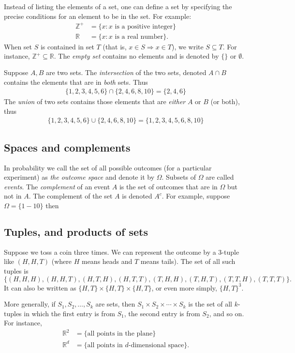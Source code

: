 Instead of listing the elements of a set, one can define a set by
specifying the precise conditions for an element to be in the set. For
example:
\begin{align*}
\mathbb{Z}^+ &= \{x: \mbox{$x$ is a positive integer}\} \\
\mathbb{R}   &= \{x: \mbox{$x$ is a real number}\} .
\end{align*}
When set $S$ is contained in set $T$ (that is, $x \in S \Rightarrow x
\in T$), we write $S \subseteq T$. For instance, $\mathbb{Z}^+
\subseteq \mathbb{R}$. The {\em empty set} contains no elements and is
denoted by $\{\}$ or $\emptyset$.

Suppose $A,B$ are two sets. The {\em intersection} of the two sets,
denoted $A\cap B$ contains the elements that are in {\em both}
sets. Thus
\begin{align*}
\{1,2,3,4,5,6\} \cap \{2,4,6,8,10\} = \{2,4,6\}
\end{align*}
The {\em union} of two sets contains those elements that are {\em
  either} $A$ or $B$ (or both), thus
\begin{align*}
\{1,2,3,4,5,6\} \cup \{2,4,6,8,10\} = \{1,2,3,4,5,6,8,10\}
\end{align*}

\subsection{Spaces and complements}
In probability we call the set of all possible outcomes (for a
particular experiment) as {\em the outcome space} and denote it by
$\Omega$. Subsets of $\Omega$ are called {\em events}. The {\em
  complement} of an event $A$ is the set of outcomes that are in
$\Omega$ but not in $A$. The complement of the set $A$ is denoted
$A^c$. For example, suppose $\Omega=\{1-10\}$ then 
\subsection{Tuples, and products of sets}

Suppose we toss a coin three times. We can represent the outcome by a 3-tuple like
$(H,H,T)$ (where $H$ means heads and $T$ means tails). The set of all
such tuples is
$$ 
\{(H,H,H), (H,H,T), (H,T,H), (H,T,T), (T,H,H), (T,H,T), (T,T,H), (T,T,T)\}.
$$
It can also be written as $\{H,T\} \times \{H,T\} \times \{H,T\}$, or even more 
simply, $\{H,T\}^3$.

More generally, if $S_1, S_2, \ldots, S_k$ are sets, then 
$S_1 \times S_2 \times \cdots \times S_k$ is the set of all $k$-tuples in which
the first entry is from $S_1$, the second entry is from $S_2$, and so on. For
instance,
\begin{align*}
\mathbb{R}^2 &= \{\mbox{all points in the plane}\} \\
\mathbb{R}^d &= \{\mbox{all points in $d$-dimensional space}\} .
\end{align*}

